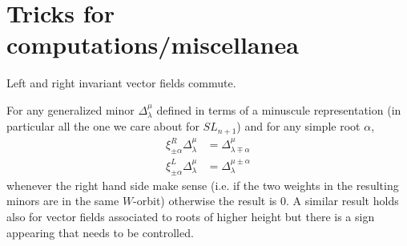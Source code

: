 \documentclass[a4paper]{amsart}
\theoremstyle{definition}
\begin{document}
\section{Tricks for computations/miscellanea}
Left and right invariant vector fields commute.

For any generalized minor $\Delta_\lambda^\mu$ defined in terms of a minuscule representation (in particular all the one we care about for $SL_{n+1}$) and for any simple root $\alpha$,
\begin{align*}
  \xi^R_{\pm\alpha} \Delta_\lambda^\mu &= \Delta_{\lambda\mp\alpha}^\mu\\
  \xi^L_{\pm\alpha} \Delta_\lambda^\mu &= \Delta_\lambda^{\mu\pm\alpha}
\end{align*}
whenever the right hand side make sense (i.e. if the two weights in the resulting minors are in the same $W$-orbit) otherwise the result is $0$.
A similar result holds also for vector fields associated to roots of higher height but there is a sign appearing that needs to be controlled.



\end{document}
